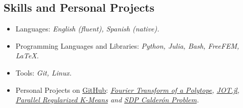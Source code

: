 \documentclass{article}
\begin{document}
\subsection*{Skills and Personal Projects}
\begin{itemize}
  \item Languages: \textit{English (fluent), Spanish (native).}
  \item Programming Languages and Libraries: \textit{Python, Julia, Bash, FreeFEM, LaTeX.}
  \item Tools: \textit{Git, Linux.}
\item Personal Projects on \href{https://github.com/jcvillaquira}{\textcolor{myblue}{GitHub}}:
\textit{\href{https://github.com/jcvillaquira/fourier-polytope}{Fourier Transform of a Polytope},
    \href{https://github.com/jcvillaquira/JOT.jl}{JOT.jl},
    \href{https://github.com/jcvillaquira/PR-KMeans}{Parallel Regularized K-Means}
    and \href{https://github.com/jcvillaquira/convex-calderon}{SDP Calder\'on Problem}.}
\end{itemize}
\end{document}
